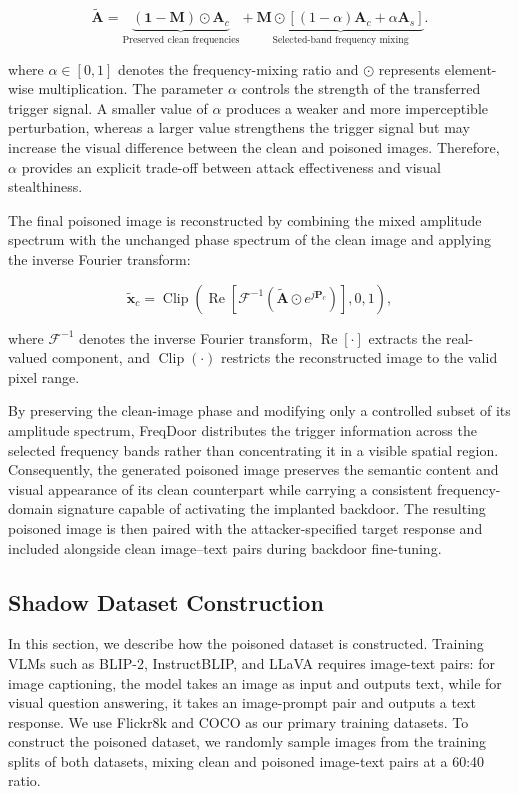 \documentclass[lettersize,journal]{IEEEtran}
\begin{document}
\begin{equation}
\widetilde{\mathbf{A}}
=
\underbrace{
(\mathbf{1}-\mathbf{M})\odot\mathbf{A}_{c}
}_{\text{Preserved clean frequencies}}
+
\underbrace{
\mathbf{M}\odot
\left[
(1-\alpha)\mathbf{A}_{c}
+
\alpha\mathbf{A}_{s}
\right]
}_{\text{Selected-band frequency mixing}}.
\label{eq:frequency_mixing}
\end{equation}

where $\alpha\in[0,1]$ denotes the frequency-mixing ratio and $\odot$ represents element-wise multiplication. The parameter $\alpha$ controls the strength of the transferred trigger signal. A smaller value of $\alpha$ produces a weaker and more imperceptible perturbation, whereas a larger value strengthens the trigger signal but may increase the visual difference between the clean and poisoned images. Therefore, $\alpha$ provides an explicit trade-off between attack effectiveness and visual stealthiness.

The final poisoned image is reconstructed by combining the mixed amplitude spectrum with the unchanged phase spectrum of the clean image and applying the inverse Fourier transform:

\begin{equation}
\widetilde{\mathbf{x}}_{c}
=
\operatorname{Clip}
\left(
\operatorname{Re}
\left[
\mathcal{F}^{-1}
\left(
\widetilde{\mathbf{A}}
\odot
e^{j\mathbf{P}_{c}}
\right)
\right],
0,1
\right),
\label{eq:poisoned_image_reconstruction}
\end{equation}

where $\mathcal{F}^{-1}$ denotes the inverse Fourier transform, $\operatorname{Re}[\cdot]$ extracts the real-valued component, and $\operatorname{Clip}(\cdot)$ restricts the reconstructed image to the valid pixel range.

By preserving the clean-image phase and modifying only a controlled subset of its amplitude spectrum, FreqDoor distributes the trigger information across the selected frequency bands rather than concentrating it in a visible spatial region. Consequently, the generated poisoned image preserves the semantic content and visual appearance of its clean counterpart while carrying a consistent frequency-domain signature capable of activating the implanted backdoor. The resulting poisoned image is then paired with the attacker-specified target response and included alongside clean image--text pairs during backdoor fine-tuning.

\subsection{Shadow Dataset Construction}
\label{subsec:dataset_contruction}
In this section, we describe how the poisoned dataset is constructed. Training VLMs such as BLIP-2, InstructBLIP, and LLaVA requires image-text pairs: for image captioning, the model takes an image as input and outputs text, while for visual question answering, it takes an image-prompt pair and outputs a text response. We use Flickr8k and COCO as our primary training datasets. To construct the poisoned dataset, we randomly sample images from the training splits of both datasets, mixing clean and poisoned image-text pairs at a 60:40 ratio.
\end{document}
